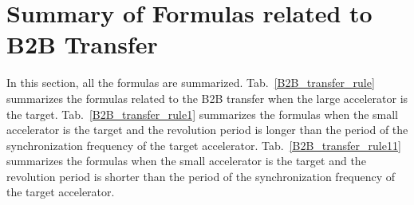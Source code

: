 
\section{Summary of Formulas related to B2B Transfer}
In this section, all the formulas are summarized.  Tab.~\ref{B2B_transfer_rule} summarizes the formulas related to the B2B transfer when the large accelerator is the target. Tab.~\ref{B2B_transfer_rule1} summarizes the formulas when the small accelerator is the target and the revolution period is longer than the period of the synchronization frequency of the target accelerator. Tab.~\ref{B2B_transfer_rule11} summarizes the formulas when the small accelerator is the target and the revolution period is shorter than the period of the synchronization frequency of the target accelerator.
